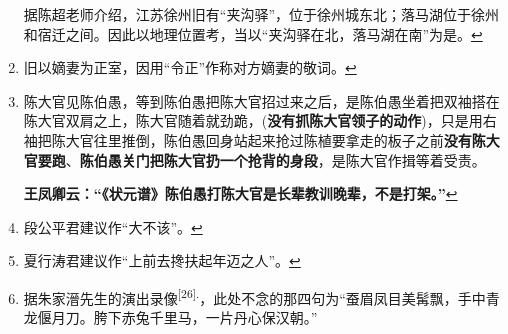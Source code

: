 \begin{enumerate}
  据陈超老师介绍，江苏徐州旧有``夹沟驿''，位于徐州城东北；落马湖位于徐州和宿迁之间。因此以地理位置考，当以``夹沟驿在北，落马湖在南''为是。\protect\hyperlink{fnref624}{↩}
\item
  \leavevmode\hypertarget{fn625}{}%
  旧以嫡妻为正室，因用``令正''作称对方嫡妻的敬词。\protect\hyperlink{fnref625}{↩}
\item
  \leavevmode\hypertarget{fn626}{}%
  陈大官见陈伯愚，等到陈伯愚把陈大官招过来之后，是陈伯愚坐着把双袖搭在陈大官双肩之上，陈大官随着就劲跪，(\textbf{没有抓陈大官领子的动作})，只是用右袖把陈大官往里推倒，陈伯愚回身站起来抢过陈植要拿走的板子之前\textbf{没有陈大官要跑}、\textbf{陈伯愚关门把陈大官扔一个抢背的身段}，是陈大官作揖等着受责。

  \textbf{王凤卿云：``《状元谱》陈伯愚打陈大官是长辈教训晚辈，不是打架。''}\protect\hyperlink{fnref626}{↩}
\item
  \leavevmode\hypertarget{fn627}{}%
  段公平君建议作``大不该''。\protect\hyperlink{fnref627}{↩}
\item
  \leavevmode\hypertarget{fn628}{}%
  夏行涛君建议作``上前去搀扶起年迈之人''。\protect\hyperlink{fnref628}{↩}
\item
  \leavevmode\hypertarget{fn629}{}%
  据朱家溍先生的演出录像\textsuperscript{{[}26{]}.}，此处不念的那四句为``蚕眉凤目美髯飘，手中青龙偃月刀。胯下赤兔千里马，一片丹心保汉朝。''


\end{enumerate}
